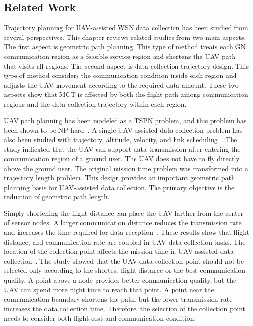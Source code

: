\documentclass[12pt]{ksthesis}
\begin{document}
\begin{thesis}
{%
\chapter{Related Work}\label{Chap:Related}
    
    Trajectory planning for UAV-assisted WSN data collection has been studied from several perspectives. This chapter reviews related studies from two main aspects. The first aspect is geometric path planning. This type of method treats each GN communication region as a feasible service region and shortens the UAV path that visits all regions. The second aspect is data collection trajectory design. This type of method considers the communication condition inside each region and adjusts the UAV movement according to the required data amount. These two aspects show that MCT is affected by both the flight path among communication regions and the data collection trajectory within each region.    

    UAV path planning has been modeled as a TSPN problem, and this problem has been shown to be NP-hard~\cite{Luo2021TrajectoryWSN}. A single-UAV-assisted data collection problem has also been studied with trajectory, altitude, velocity, and link scheduling~\cite{Li2020JointOptimization}. The study indicated that the UAV can support data transmission after entering the communication region of a ground user. The UAV does not have to fly directly above the ground user. The original mission time problem was transformed into a trajectory length problem. This design provides an important geometric path planning basis for UAV-assisted data collection. The primary objective is the reduction of geometric path length.

    Simply shortening the flight distance can place the UAV farther from the center of sensor nodes. A larger communication distance reduces the transmission rate and increases the time required for data reception~\cite{Gong2018FlightTimeMinimization}. These results show that flight distance, and communication rate are coupled in UAV data collection tasks. The location of the collection point affects the mission time in UAV-assisted data collection~\cite{Fu2024CollectionPoint}. The study showed that the UAV data collection point should not be selected only according to the shortest flight distance or the best communication quality. A point above a node provides better communication quality, but the UAV can spend more flight time to reach that point. A point near the communication boundary shortens the path, but the lower transmission rate increases the data collection time. Therefore, the selection of the collection point needs to consider both flight cost and communication condition.

}
\end{thesis}
\end{document}
